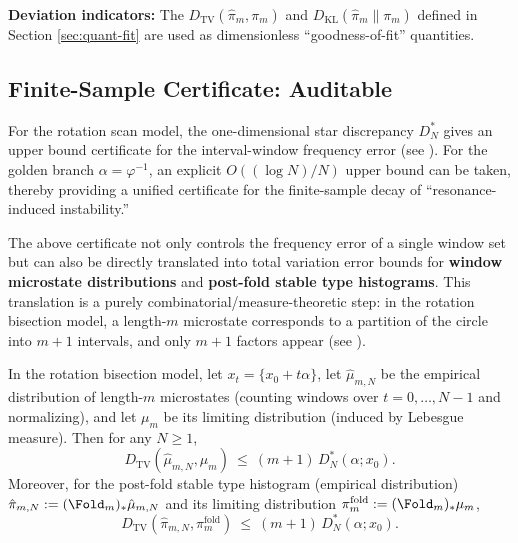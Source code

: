 \textbf{Deviation indicators:} The
\(
D_{\mathrm{TV}}(\hat{\pi}_m,\pi_m)
\)
and
\(
D_{\mathrm{KL}}(\hat{\pi}_m\|\pi_m)
\)
defined in Section \ref{sec:quant-fit} are used as dimensionless ``goodness-of-fit'' quantities.

\subsection{Finite-Sample Certificate: Auditable}

For the rotation scan model, the one-dimensional star discrepancy $D_N^*$ gives an upper bound certificate for the interval-window frequency error (see \cite{KuipersNiederreiter1974}). For the golden branch $\alpha=\varphi^{-1}$, an explicit $O((\log N)/N)$ upper bound can be taken, thereby providing a unified certificate for the finite-sample decay of ``resonance-induced instability.''

The above certificate not only controls the frequency error of a single window set but can also be directly translated into total variation error bounds for \textbf{window microstate distributions} and \textbf{post-fold stable type histograms}. This translation is a purely combinatorial/measure-theoretic step: in the rotation bisection model, a length-$m$ microstate corresponds to a partition of the circle into $m+1$ intervals, and only $m+1$ factors appear (see \cite{MorseHedlund1940,LindMarcus1995}).

\begin{theorem}\label{thm:tv-certificate-hist}
In the rotation bisection model, let $x_t=\{x_0+t\alpha\}$, let $\hat{\mu}_{m,N}$ be the empirical distribution of length-$m$ microstates (counting windows over $t=0,\dots,N-1$ and normalizing), and let $\mu_m$ be its limiting distribution (induced by Lebesgue measure). Then for any $N\ge 1$,
\[
D_{\mathrm{TV}}(\hat{\mu}_{m,N},\mu_m)\ \le\ (m+1)\,D_N^*(\alpha;x_0).
\]
Moreover, for the post-fold stable type histogram (empirical distribution) $\hat{\pi}_{m,N}:=(\Fold_m)_*\hat{\mu}_{m,N}$ and its limiting distribution $\pi_m^{\mathrm{fold}}:=(\Fold_m)_*\mu_m$,
\[
D_{\mathrm{TV}}(\hat{\pi}_{m,N},\pi_m^{\mathrm{fold}})\ \le\ (m+1)\,D_N^*(\alpha;x_0).
\]
\end{theorem}

